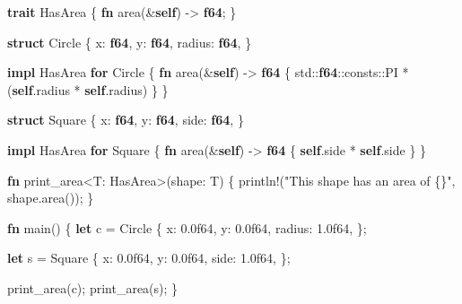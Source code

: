 \documentclass[a4paper,]{book}
\newenvironment{Shaded}{\begin{snugshade}}{\end{snugshade}}
\newcommand{\KeywordTok}[1]{\textcolor[rgb]{0.13,0.29,0.53}{\textbf{{#1}}}}
\newcommand{\DecValTok}[1]{\textcolor[rgb]{0.00,0.00,0.81}{{#1}}}
\newcommand{\StringTok}[1]{\textcolor[rgb]{0.31,0.60,0.02}{{#1}}}
\newcommand{\OtherTok}[1]{\textcolor[rgb]{0.56,0.35,0.01}{{#1}}}
\newcommand{\NormalTok}[1]{{#1}}
\begin{document}
\begin{Shaded}
\begin{Highlighting}[]
\KeywordTok{trait} \NormalTok{HasArea \{}
    \KeywordTok{fn} \NormalTok{area(&}\KeywordTok{self}\NormalTok{) -> }\KeywordTok{f64}\NormalTok{;}
\NormalTok{\}}

\KeywordTok{struct} \NormalTok{Circle \{}
    \NormalTok{x: }\KeywordTok{f64}\NormalTok{,}
    \NormalTok{y: }\KeywordTok{f64}\NormalTok{,}
    \NormalTok{radius: }\KeywordTok{f64}\NormalTok{,}
\NormalTok{\}}

\KeywordTok{impl} \NormalTok{HasArea }\KeywordTok{for} \NormalTok{Circle \{}
    \KeywordTok{fn} \NormalTok{area(&}\KeywordTok{self}\NormalTok{) -> }\KeywordTok{f64} \NormalTok{\{}
        \NormalTok{std::}\KeywordTok{f64}\NormalTok{::consts::PI * (}\KeywordTok{self}\NormalTok{.radius * }\KeywordTok{self}\NormalTok{.radius)}
    \NormalTok{\}}
\NormalTok{\}}

\KeywordTok{struct} \NormalTok{Square \{}
    \NormalTok{x: }\KeywordTok{f64}\NormalTok{,}
    \NormalTok{y: }\KeywordTok{f64}\NormalTok{,}
    \NormalTok{side: }\KeywordTok{f64}\NormalTok{,}
\NormalTok{\}}

\KeywordTok{impl} \NormalTok{HasArea }\KeywordTok{for} \NormalTok{Square \{}
    \KeywordTok{fn} \NormalTok{area(&}\KeywordTok{self}\NormalTok{) -> }\KeywordTok{f64} \NormalTok{\{}
        \KeywordTok{self}\NormalTok{.side * }\KeywordTok{self}\NormalTok{.side}
    \NormalTok{\}}
\NormalTok{\}}

\KeywordTok{fn} \NormalTok{print_area<T: HasArea>(shape: T) \{}
    \OtherTok{println!}\NormalTok{(}\StringTok{"This shape has an area of \{\}"}\NormalTok{, shape.area());}
\NormalTok{\}}

\KeywordTok{fn} \NormalTok{main() \{}
    \KeywordTok{let} \NormalTok{c = Circle \{}
        \NormalTok{x: }\DecValTok{0.0f64}\NormalTok{,}
        \NormalTok{y: }\DecValTok{0.0f64}\NormalTok{,}
        \NormalTok{radius: }\DecValTok{1.0f64}\NormalTok{,}
    \NormalTok{\};}

    \KeywordTok{let} \NormalTok{s = Square \{}
        \NormalTok{x: }\DecValTok{0.0f64}\NormalTok{,}
        \NormalTok{y: }\DecValTok{0.0f64}\NormalTok{,}
        \NormalTok{side: }\DecValTok{1.0f64}\NormalTok{,}
    \NormalTok{\};}

    \NormalTok{print_area(c);}
    \NormalTok{print_area(s);}
\NormalTok{\}}
\end{Highlighting}
\end{Shaded}
\end{document}
